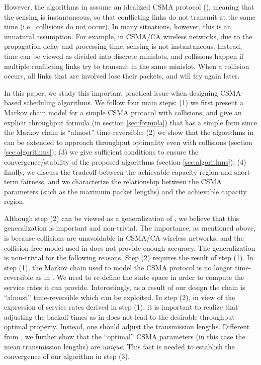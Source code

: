 \documentclass{IEEEtran}
\begin{document}
However, the algorithms in \cite{Allerton} assume an idealized CSMA
protocol (\cite{csma-87,Kar,Thiran,BoE}), meaning that the sensing
is instantaneous, so that conflicting links do not transmit at the
same time (i.e., collisions do not occur). In many situations, however,
this is an unnatural assumption. For example, in CSMA/CA wireless
networks, due to the propagation delay and processing time, sensing
is not instantaneous. Instead, time can be viewed as divided into
discrete minislots, and collisions happen if multiple conflicting
links try to transmit in the same minislot. When a collision occurs,
all links that are involved lose their packets, and will try again
later. \begin{comment}
As another example, in a task processing network, if the requests
for resources are initiated in discrete slots, then there is also
an issue of collision and contention resolution.
\end{comment}
{}

In this paper, we study this important practical issue when designing
CSMA-based scheduling algorithms. We follow four main steps: (1) we
first present a Markov chain model for a simple CSMA protocol with
collisions, and give an explicit throughput formula (in section \ref{sec:formula})
that has a simple form since the Markov chain is {}``almost'' time-reversible;
(2) we show that the algorithms in \cite{Allerton} can be extended
to approach throughput optimality even with collisions (section \ref{sec:algorithms});
(3) we give sufficient conditions to ensure the convergence/stability
of the proposed algorithms (section \ref{sec:algorithms}); (4) finally,
we discuss the tradeoff between the achievable capacity region and
short-term fairness, and we characterize the relationship between
the CSMA parameters (such as the maximum packet lengths) and the achievable
capacity region. 

Although step (2) can be viewed as a generalization of \cite{Allerton},
we believe that this generalization is important and non-trivial.
The importance, as mentioned above, is because collisions are unavoidable
in CSMA/CA wireless networks, and the collision-free model used in
\cite{Allerton} does not provide enough accuracy. The generalization
is non-trivial for the following reasons. Step (2) requires the result
of step (1). In step (1), the Markov chain used to model the CSMA
protocol is no longer time-reversible as in \cite{Allerton}. We need
to re-define the state space in order to compute the service rates
it can provide. Interestingly, as a result of our design the chain
is {}``almost'' time-reversible which can be exploited. In step
(2), in view of the expression of service rates derived in step (1),
it is important to realize that adjusting the backoff times as in
\cite{Allerton} does not lead to the desirable throughput-optimal
property. Instead, one should adjust the transmission lengths. Different
from \cite{Allerton}, we further show that the {}``optimal'' CSMA
parameters (in this case the mean transmission lengths) are \emph{unique}.
This fact is needed to establish the convergence of our algorithm
in step (3).
\end{document}
